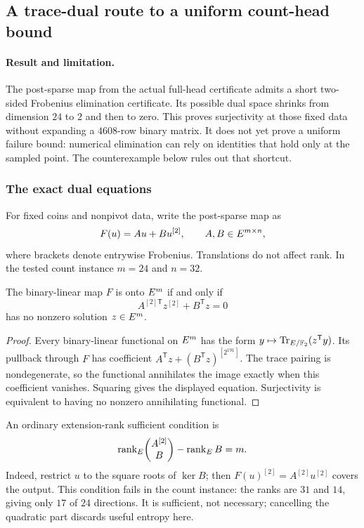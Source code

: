 \subsection{A trace-dual route to a uniform count-head bound}\label{note:zk-count-dual}

\paragraph{Result and limitation.} The post-sparse map from the actual full-head certificate admits a short two-sided Frobenius elimination certificate. Its possible dual space shrinks from dimension $24$ to $2$ and then to zero. This proves surjectivity at those fixed data without expanding a $4608$-row binary matrix. It does not yet prove a uniform failure bound: numerical elimination can rely on identities that hold only at the sampled point. The counterexample below rules out that shortcut.

\subsubsection{The exact dual equations}

For fixed coins and nonpivot data, write the post-sparse map as
\[
 F(u)=Au+Bu^{[2]},\qquad A,B\in E^{m\times n},
\]
where brackets denote entrywise Frobenius. Translations do not affect rank. In the tested count instance $m=24$ and $n=32$.

\begin{proposition}
The binary-linear map $F$ is onto $E^m$ if and only if
\[
 A^{[2]\mathsf T}z^{[2]}+B^{\mathsf T}z=0
\]
has no nonzero solution $z\in E^m$.
\end{proposition}
\begin{proof}
Every binary-linear functional on $E^m$ has the form $y\mapsto\operatorname{Tr}_{E/\mathbb{F}_2}(z^{\mathsf T}y)$. Its pullback through $F$ has coefficient $A^{\mathsf T}z+(B^{\mathsf T}z)^{[2^{191}]}$. The trace pairing is nondegenerate, so the functional annihilates the image exactly when this coefficient vanishes. Squaring gives the displayed equation. Surjectivity is equivalent to having no nonzero annihilating functional.
\end{proof}

An ordinary extension-rank sufficient condition is
\[
 \operatorname{rank}_{E}\!\begin{pmatrix}A^{[2]}\\B\end{pmatrix}
 -\operatorname{rank}_{E}B=m.
\]
Indeed, restrict $u$ to the square roots of $\ker B$; then $F(u)^{[2]}=A^{[2]}u^{[2]}$ covers the output. This condition fails in the count instance: the ranks are $31$ and $14$, giving only $17$ of $24$ directions. It is sufficient, not necessary; cancelling the quadratic part discards useful entropy here.

